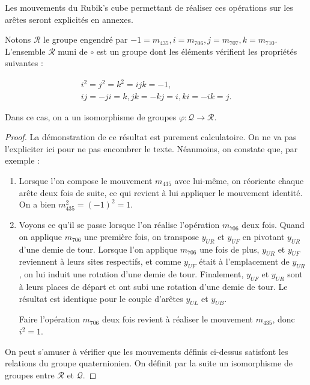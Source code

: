 \documentclass[french]{report}
\begin{document}
Les mouvements du Rubik's cube permettant de réaliser ces opérations sur les arêtes seront explicités en annexes.

Notons $\mathcal{R}$ le groupe engendré par $ -1 = m _{435}, i =m _{706}, j= m _{707}, k= m _{710}$. L'ensemble $\mathcal{R}$ muni de $\circ$ est un groupe dont les éléments vérifient les propriétés suivantes :

\begin{gather}
  i ^2 = j ^2 = k ^2 = ijk = -1, \label{quaternions}\\
  ij = -ji = k, jk = -kj = i, ki = -ik = j. \label{quaternions2}
\end{gather}

Dans ce cas, on a un isomorphisme de groupes $\varphi : \mathcal{Q} \to \mathcal{R}$.

\begin{proof}

La démonstration de ce résultat est purement calculatoire. On ne va pas l'expliciter ici pour ne pas encombrer le texte. Néanmoins, on constate que, par exemple :

\begin{enumerate}
  \item Lorsque l'on compose le mouvement $m _{435}$ avec lui-même, on réoriente chaque arête deux fois de suite, ce qui revient à lui appliquer le mouvement identité. On a bien $m _{435} ^{2} = (-1) ^{2} = 1$.
  \item Voyons ce qu'il se passe lorsque l'on réalise l'opération $m _{706}$ deux fois. Quand on applique $m _{706}$ une première fois, on transpose $y _{UR}$ et $y _{UF}$ en pivotant $y _{UR}$ d'une demie de tour. Lorsque l'on applique $m _{706}$ une fois de plus, $y _{UR}$ et $y _{UF}$ reviennent à leurs sites respectifs, et comme $y _{UF}$ était à l'emplacement de $y _{UR}$, on lui induit une rotation d'une demie de tour. Finalement, $y _{UF}$ et $y _{UR}$ sont à leurs places de départ et ont subi une rotation d'une demie de tour. Le résultat est identique pour le couple d'arêtes $y _{UL}$ et $y _{UB}$.

  Faire l'opération $m _{706}$ deux fois revient à réaliser le mouvement $m _{435}$, donc $i ^2 = 1$.
\end{enumerate}

On peut s'amuser à vérifier que les mouvements définis ci-dessus satisfont les relations du groupe quaternionien. On définit par la suite un isomorphisme de groupes entre $\mathcal{R}$ et $\mathcal{Q}$.


\end{proof}
\end{document}

